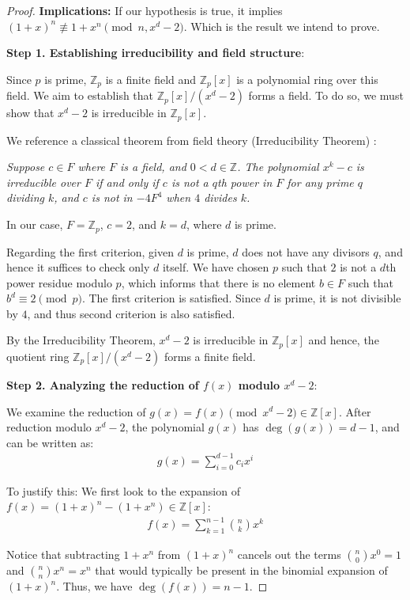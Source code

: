 \documentclass{article}
\theoremstyle{plain}
\theoremstyle{definition}
\begin{document}
\begin{proof}
\textbf{Implications:}
If our hypothesis is true, it implies $(1 + x)^n \not\equiv 1 + x^n \pmod{n, x^d-2}$. Which is the result we intend to prove.

\textbf{Step 1. Establishing irreducibility and field structure}:

Since $p$ is prime, $\mathbb{Z}_p$ is a finite field and $\mathbb{Z}_p[x]$ is a polynomial ring over this field. We aim to establish that $\mathbb{Z}_p[x]/(x^d - 2)$ forms a field. To do so, we must show that $x^d - 2$ is irreducible in $\mathbb{Z}_p[x]$.

We reference a classical theorem from field theory (Irreducibility Theorem) \cite{karpilovsky1989fields}:

\textit{Suppose $c \in F$ where $F$ is a field, and $0 < d \in \mathbb{Z}$. The polynomial $x^k - c$ is irreducible over $F$ if and only if $c$ is not a $q$th power in $F$ for any prime $q$ dividing $k$, and $c$ is not in $-4F^4$ when $4$ divides $k$.}

In our case, $F = \mathbb{Z}_p$, $c = 2$, and $k = d$, where $d$ is prime.

Regarding the first criterion, given $d$ is prime, $d$ does not have any divisors $q$, and hence it suffices to check only $d$ itself. We have chosen $p$ such that $2$ is not a $d$th power residue modulo $p$, which informs that there is no element $b \in F$ such that $b^d \equiv 2 \pmod{p}$. The first criterion is satisfied. Since $d$ is prime, it is not divisible by $4$, and thus second criterion is also satisfied.

By the Irreducibility Theorem, $x^d - 2$ is irreducible in $\mathbb{Z}_p[x]$ and hence, the quotient ring $\mathbb{Z}_p[x]/(x^d - 2)$ forms a finite field.

\textbf{Step 2. Analyzing the reduction of $f(x)$ modulo $x^d - 2$}:

We examine the reduction of $g(x) = f(x) \pmod{x^d - 2} \in \mathbb{Z}[x]$. After reduction modulo $x^d - 2$, the polynomial $g(x)$ has $\deg(g(x)) = d-1$, and can be written as:
\begin{align}
    g(x) = \sum_{i=0}^{d-1} c_i x^i
\end{align}

To justify this: We first look to the expansion of  $f(x) = (1 + x)^n - (1 + x^n) \in \mathbb{Z}[x]$:
\begin{align}
    f(x) = \sum_{k=1}^{n-1} \binom{n}{k} x^k
\end{align}

Notice that subtracting $1+x^n$ from $(1+x)^n$ cancels out the terms $\binom{n}{0} x^0 = 1$ and $\binom{n}{n} x^n = x^n$ that would typically be present in the binomial expansion of $(1+x)^n$. Thus, we have $\deg(f(x))=n-1$.


\end{proof}
\end{document}
